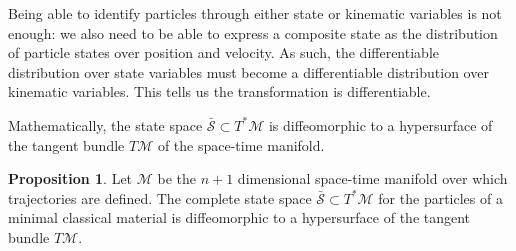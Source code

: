 \documentclass[smallextended]{svjour3}
\numberwithin{equation}{section}
\theoremstyle{definition}
\newtheorem{prop}[equation]{Proposition}
\begin{document}
Being able to identify particles through either state or kinematic variables is not enough: we also need to be able to express a composite state as the distribution of particle states over position and velocity. As such, the differentiable distribution over state variables must become a differentiable distribution over kinematic variables. This tells us the transformation is differentiable.

Mathematically, the state space $\bar{\mathcal{S}} \subset T^*\mathcal{M}$ is diffeomorphic to a hypersurface of the tangent bundle $T\mathcal{M}$ of the space-time manifold.

\begin{prop}\label{prop:tangent_bundle}
	Let $\mathcal{M}$ be the $n+1$ dimensional space-time manifold over which trajectories are defined. The complete state space $\bar{\mathcal{S}} \subset T^*\mathcal{M}$ for the particles of a minimal classical material is diffeomorphic to a hypersurface of the tangent bundle $T\mathcal{M}$.
\end{prop}
\end{document}
